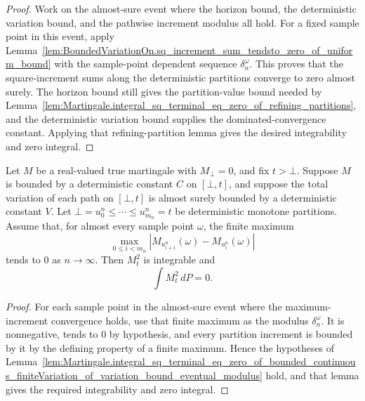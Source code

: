 \begin{proof}
Work on the almost-sure event where the horizon bound, the deterministic
variation bound, and the pathwise increment modulus all hold.  For a fixed
sample point in this event, apply
Lemma~\ref{lem:BoundedVariationOn.sq_increment_sum_tendsto_zero_of_uniform_bound}
with the sample-point dependent sequence \(\delta^\omega_n\).  This proves
that the square-increment sums along the deterministic partitions converge to
zero almost surely.  The horizon bound still gives the partition-value bound
needed by
Lemma~\ref{lem:Martingale.integral_sq_terminal_eq_zero_of_refining_partitions},
and the deterministic variation bound supplies the dominated-convergence
constant.  Applying that refining-partition lemma gives the desired
integrability and zero integral.
\end{proof}

\begin{lemma}\label{lem:Martingale.integral_sq_terminal_eq_zero_of_bounded_continuous_finiteVariation_of_variation_bound_sup_modulus}
Let \(M\) be a real-valued true martingale with \(M_\bot=0\), and fix
\(t>\bot\).  Suppose \(M\) is bounded by a deterministic constant \(C\) on
\([\bot,t]\), and suppose the total variation of each path on \([\bot,t]\) is
almost surely bounded by a deterministic constant \(V\).  Let
\(\bot=u^n_0\le\cdots\le u^n_{m_n}=t\) be deterministic monotone partitions.
Assume that, for almost every sample point \(\omega\), the finite maximum
\[
  \max_{0\le i<m_n}
  |M_{u^n_{i+1}}(\omega)-M_{u^n_i}(\omega)|
\]
tends to \(0\) as \(n\to\infty\).  Then \(M_t^2\) is integrable and
\[
  \int M_t^2\,dP=0 .
\]
\end{lemma}

\begin{proof}
For each sample point in the almost-sure event where the maximum-increment
convergence holds, use that finite maximum as the modulus
\(\delta^\omega_n\).  It is nonnegative, tends to \(0\) by hypothesis, and
every partition increment is bounded by it by the defining property of a
finite maximum.  Hence the hypotheses of
Lemma~\ref{lem:Martingale.integral_sq_terminal_eq_zero_of_bounded_continuous_finiteVariation_of_variation_bound_eventual_modulus}
hold, and that lemma gives the required integrability and zero integral.
\end{proof}

